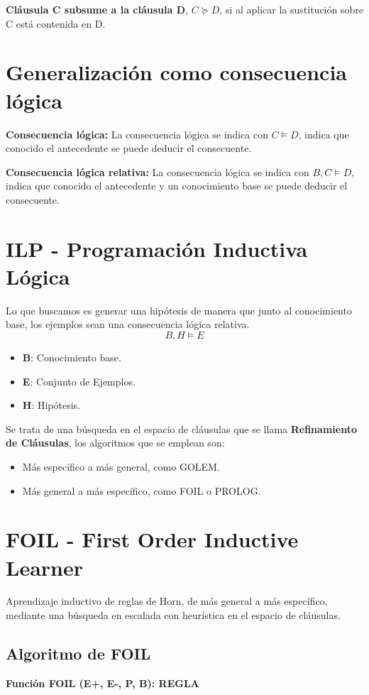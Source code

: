 \documentclass[12pt, twoside, openright]{report} %
\begin{document}
\textbf{Cláusula C subsume a la cláusula D}, $C \succeq D$, si al aplicar la sustitución sobre C está contenida en D.

\section{Generalización como consecuencia lógica}
\textbf{Consecuencia lógica:} La consecuencia lógica se indica con $C \vDash D$, indica que conocido el antecedente se puede deducir el consecuente.

\textbf{Consecuencia lógica relativa:} La consecuencia lógica se indica con $B,C \vDash D$, indica que conocido el antecedente y un conocimiento base se puede deducir el consecuente.

\section{ILP - Programación Inductiva Lógica}
Lo que buscamos es generar una hipótesis de manera que junto al conocimiento base, los ejemplos sean una consecuencia lógica relativa.
$$B,H \vDash E$$
\begin{itemize}
  \item \textbf{B}: Conocimiento base.
  \item \textbf{E}: Conjunto de Ejemplos.
  \item \textbf{H}: Hipótesis.
\end{itemize}

Se trata de una búsqueda en el espacio de cláusulas que se llama \textbf{Refinamiento de Cláusulas}, los algoritmos que se emplean son:
\begin{itemize}
  \item Más específico a más general, como GOLEM.
  \item Más general a más específico, como FOIL o PROLOG.
\end{itemize} 

\section{FOIL - First Order Inductive Learner}
Aprendizaje inductivo de reglas de Horn, de más general a más específico, mediante una búsqueda en escalada con heurística en el espacio de cláusulas.

\subsection{Algoritmo de FOIL}
\textbf{Función FOIL (E+, E-, P, B): REGLA}
\end{document}
